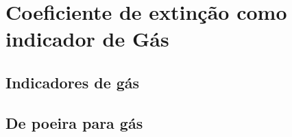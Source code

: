 



\chapter{Coeficiente de extinção como indicador de Gás}
\label{sec:gas}
\section{Indicadores de gás}
\label{sec:synvsneb:proxies}
\section{De poeira para gás}
\label{sec:synvsneb:proxies}

